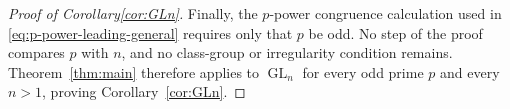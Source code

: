 \documentclass[11pt]{amsart}
\numberwithin{equation}{section}
\newcommand{\GL}{\operatorname{GL}}
\theoremstyle{definition}
\begin{document}
\begin{proof}[Proof of Corollary\ref{cor:GLn}]
Finally, the $p$-power congruence calculation used in
\eqref{eq:p-power-leading-general} requires only that $p$ be odd.  No
step of the proof compares $p$ with $n$, and no class-group or
irregularity condition remains.  Theorem~\ref{thm:main} therefore
applies to $\GL_n$ for every odd prime $p$ and every $n>1$, proving
Corollary~\ref{cor:GLn}.
\end{proof}



\end{document}
